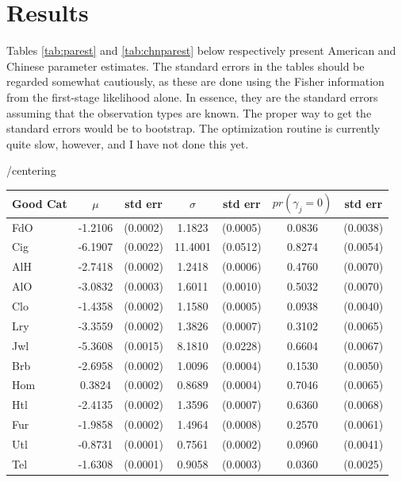 \documentclass[12pt]{article}
\begin{document}
\section{Results}
Tables \ref{tab:parest} and \ref{tab:chnparest} below respectively present American and Chinese parameter estimates.  
The standard errors in the tables should be regarded somewhat cautiously, as these are done using the Fisher information from the first-stage likelihood alone.  In essence, they are the standard errors assuming that the observation types are known.  The proper way to get the standard errors would be to bootstrap.  The optimization routine is currently quite slow, however, and I have not done this yet.
\begin{table}
	/centering
		\begin{tabular}{|l|c c |c c |c c|}
			\hline
			Good Cat & $\mu$ & std err      & $\sigma$ & std err       & $pr(\gamma_j =  0)$ & std err\\
			\hline
			FdO & -1.2106 &  (0.0002) &  1.1823 & (0.0005) &   0.0836 & (0.0038)\\ 
			\hline
			Cig & -6.1907 &  (0.0022) & 11.4001 & (0.0512) &   0.8274 & (0.0054)\\ 
			\hline
			AlH & -2.7418 &  (0.0002) &  1.2418 & (0.0006) &   0.4760 & (0.0070)\\ 
			\hline
			AlO & -3.0832 &  (0.0003) &  1.6011 & (0.0010) &   0.5032 & (0.0070)\\ 
			\hline
			Clo & -1.4358 &  (0.0002) &  1.1580 & (0.0005) &   0.0938 & (0.0040)\\ 
			\hline
			Lry & -3.3559 &  (0.0002) &  1.3826 & (0.0007) &   0.3102 & (0.0065)\\ 
			\hline
			Jwl & -5.3608 &  (0.0015) &  8.1810 & (0.0228) &   0.6604 & (0.0067)\\ 
			\hline
			Brb & -2.6958 &  (0.0002) &  1.0096 & (0.0004) &   0.1530 & (0.0050)\\ 
			\hline
			Hom &  0.3824 &  (0.0002) &  0.8689 & (0.0004) &   0.7046 & (0.0065)\\ 
			\hline
			Htl & -2.4135 &  (0.0002) &  1.3596 & (0.0007) &   0.6360 & (0.0068)\\ 
			\hline
			Fur & -1.9858 &  (0.0002) &  1.4964 & (0.0008) &   0.2570 & (0.0061)\\ 
			\hline
			Utl & -0.8731 &  (0.0001) &  0.7561 & (0.0002) &   0.0960 & (0.0041)\\ 
			\hline
			Tel & -1.6308 &  (0.0001) &  0.9058 & (0.0003) &   0.0360 & (0.0025)\\ 

\end{tabular}
\end{table}
\end{document}
